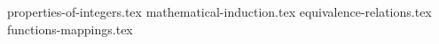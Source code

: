 \setcounter{chapter}{0}
\setcounter{section}{0}
{properties-of-integers.tex}
{mathematical-induction.tex}
{equivalence-relations.tex}
{functions-mappings.tex}
